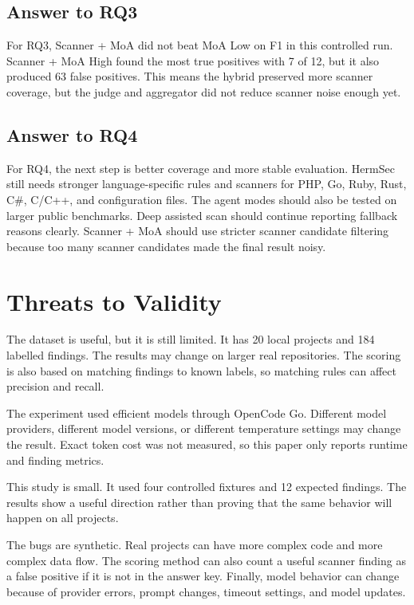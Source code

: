 \documentclass[sigconf,nonacm]{acmart}
\begin{document}
\subsection{Answer to RQ3}
For RQ3, Scanner + MoA did not beat MoA Low on F1 in this controlled run. Scanner + MoA High found the most true positives with 7 of 12, but it also produced 63 false positives. This means the hybrid preserved more scanner coverage, but the judge and aggregator did not reduce scanner noise enough yet.

\subsection{Answer to RQ4}
For RQ4, the next step is better coverage and more stable evaluation. HermSec still needs stronger language-specific rules and scanners for PHP, Go, Ruby, Rust, C\#, C/C++, and configuration files. The agent modes should also be tested on larger public benchmarks. Deep assisted scan should continue reporting fallback reasons clearly. Scanner + MoA should use stricter scanner candidate filtering because too many scanner candidates made the final result noisy.

\section{Threats to Validity}

The dataset is useful, but it is still limited. It has 20 local projects and 184 labelled findings. The results may change on larger real repositories. The scoring is also based on matching findings to known labels, so matching rules can affect precision and recall.

The experiment used efficient models through OpenCode Go. Different model providers, different model versions, or different temperature settings may change the result. Exact token cost was not measured, so this paper only reports runtime and finding metrics.

This study is small. It used four controlled fixtures and 12 expected findings. The results show a useful direction rather than proving that the same behavior will happen on all projects.

The bugs are synthetic. Real projects can have more complex code and more complex data flow. The scoring method can also count a useful scanner finding as a false positive if it is not in the answer key. Finally, model behavior can change because of provider errors, prompt changes, timeout settings, and model updates.
\end{document}
